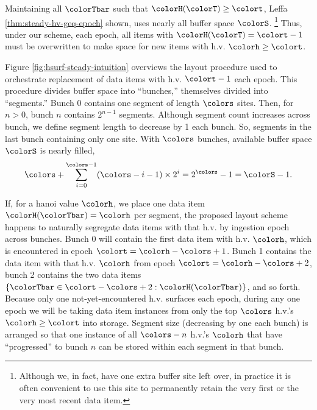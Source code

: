 

Maintaining all $\colorTbar$ such that $\colorH(\colorT) \geq \colort$, Leffa \ref{thm:steady-hv-geq-epoch} shown, uses nearly all buffer space $\colorS$.%
\footnote{%
Although we, in fact, have one extra buffer site left over, in practice it is often convenient to use this site to permanently retain the very first or the very most recent data item.%
}
Thus, under our scheme, each epoch, all items with $\colorH(\colorT) = \colort - 1$ must be overwritten to make space for new items with h.v. $\colorh \geq \colort$.

Figure \ref{fig:hsurf-steady-intuition} overviews the layout procedure used to orchestrate replacement of data items with h.v. $\colort - 1$ each epoch.
This procedure divides buffer space into ``bunches,'' themselves divided into ``segments.''
Bunch 0 contains one segment of length $\colors$ sites.
Then, for $n > 0$, bunch $n$ contains $2^{n-1}$ segments.
Although segment count increases across bunch, we define segment length to decrease by 1 each bunch.
So, segments in the last bunch containing only one site.
With $\colors$ bunches, available buffer space $\colorS$ is nearly filled,
\begin{align*}
\colors + \sum_{i=0}^{\colors-1} (\colors - i - 1) \times 2^{i} = 2^{\colors} - 1 = \colorS - 1.
\end{align*}

If, for a hanoi value $\colorh$, we place one data item $\colorH(\colorTbar) = \colorh$ per segment, the proposed layout scheme happens to naturally segregate data items with that h.v. by ingestion epoch across bunches.
Bunch 0 will contain the first data item with h.v. $\colorh$, which is encountered in epoch $\colort=\colorh - \colors + 1$.
Bunch 1 contains the data item with that h.v. $\colorh$ from epoch $\colort=\colorh - \colors + 2$, bunch 2 contains the two data items $\{ \colorTbar \in \colort - \colors + 2 : \colorH(\colorTbar) \}$, and so forth.
Because only one not-yet-encountered h.v. surfaces each epoch, during any one epoch we will be taking data item instances from only the top $\colors$ h.v.'s $\colorh \geq \colort$ into storage.
Segment size (decreasing by one each bunch) is arranged so that one instance of all $\colors - n$ h.v.'s $\colorh$ that have ``progressed'' to bunch $n$ can be stored within each segment in that bunch.



